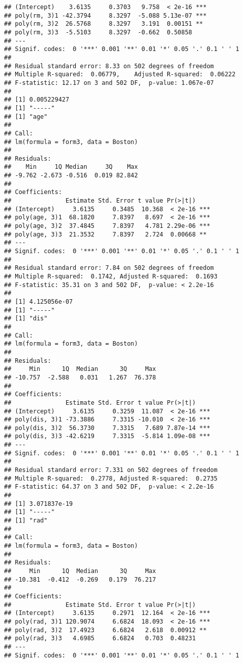 \documentclass[]{article}
\begin{document}
\begin{verbatim}
## (Intercept)    3.6135     0.3703   9.758  < 2e-16 ***
## poly(rm, 3)1 -42.3794     8.3297  -5.088 5.13e-07 ***
## poly(rm, 3)2  26.5768     8.3297   3.191  0.00151 ** 
## poly(rm, 3)3  -5.5103     8.3297  -0.662  0.50858    
## ---
## Signif. codes:  0 '***' 0.001 '**' 0.01 '*' 0.05 '.' 0.1 ' ' 1
## 
## Residual standard error: 8.33 on 502 degrees of freedom
## Multiple R-squared:  0.06779,    Adjusted R-squared:  0.06222 
## F-statistic: 12.17 on 3 and 502 DF,  p-value: 1.067e-07
## 
## [1] 0.005229427
## [1] "-----"
## [1] "age"
## 
## Call:
## lm(formula = form3, data = Boston)
## 
## Residuals:
##    Min     1Q Median     3Q    Max 
## -9.762 -2.673 -0.516  0.019 82.842 
## 
## Coefficients:
##               Estimate Std. Error t value Pr(>|t|)    
## (Intercept)     3.6135     0.3485  10.368  < 2e-16 ***
## poly(age, 3)1  68.1820     7.8397   8.697  < 2e-16 ***
## poly(age, 3)2  37.4845     7.8397   4.781 2.29e-06 ***
## poly(age, 3)3  21.3532     7.8397   2.724  0.00668 ** 
## ---
## Signif. codes:  0 '***' 0.001 '**' 0.01 '*' 0.05 '.' 0.1 ' ' 1
## 
## Residual standard error: 7.84 on 502 degrees of freedom
## Multiple R-squared:  0.1742, Adjusted R-squared:  0.1693 
## F-statistic: 35.31 on 3 and 502 DF,  p-value: < 2.2e-16
## 
## [1] 4.125056e-07
## [1] "-----"
## [1] "dis"
## 
## Call:
## lm(formula = form3, data = Boston)
## 
## Residuals:
##     Min      1Q  Median      3Q     Max 
## -10.757  -2.588   0.031   1.267  76.378 
## 
## Coefficients:
##               Estimate Std. Error t value Pr(>|t|)    
## (Intercept)     3.6135     0.3259  11.087  < 2e-16 ***
## poly(dis, 3)1 -73.3886     7.3315 -10.010  < 2e-16 ***
## poly(dis, 3)2  56.3730     7.3315   7.689 7.87e-14 ***
## poly(dis, 3)3 -42.6219     7.3315  -5.814 1.09e-08 ***
## ---
## Signif. codes:  0 '***' 0.001 '**' 0.01 '*' 0.05 '.' 0.1 ' ' 1
## 
## Residual standard error: 7.331 on 502 degrees of freedom
## Multiple R-squared:  0.2778, Adjusted R-squared:  0.2735 
## F-statistic: 64.37 on 3 and 502 DF,  p-value: < 2.2e-16
## 
## [1] 3.071837e-19
## [1] "-----"
## [1] "rad"
## 
## Call:
## lm(formula = form3, data = Boston)
## 
## Residuals:
##     Min      1Q  Median      3Q     Max 
## -10.381  -0.412  -0.269   0.179  76.217 
## 
## Coefficients:
##               Estimate Std. Error t value Pr(>|t|)    
## (Intercept)     3.6135     0.2971  12.164  < 2e-16 ***
## poly(rad, 3)1 120.9074     6.6824  18.093  < 2e-16 ***
## poly(rad, 3)2  17.4923     6.6824   2.618  0.00912 ** 
## poly(rad, 3)3   4.6985     6.6824   0.703  0.48231    
## ---
## Signif. codes:  0 '***' 0.001 '**' 0.01 '*' 0.05 '.' 0.1 ' ' 1

\end{verbatim}
\end{document}

